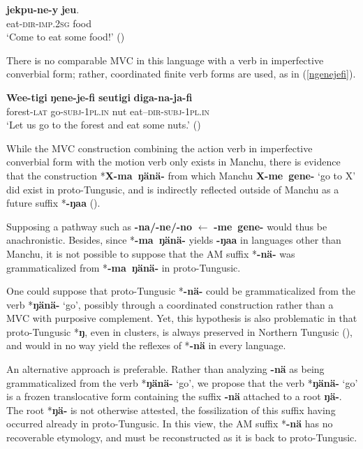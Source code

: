 \documentclass{article}
\newcommand{\ipa}[1]{\textbf{{\phon\mbox{#1}}}} %
\begin{document}
\begin{exe}
\ex 
\gll \ipa{jekpu-ne-y} \ipa{jeu}. \\
eat-\textsc{dir-imp.2sg} food \\
\glt ‘Come to eat some food!’ (\citealt[122]{nikolaeva01udihe})
\end{exe}

There is no comparable MVC in this language with a verb in imperfective converbial form; rather, coordinated finite verb forms are used, as in (\ref{ngenejefi}).

\begin{exe}
\ex \label{ngenejefi}
\gll 
\ipa{Wee-tigi} 	\ipa{ŋene-je-fi} 	\ipa{seutigi} 	\ipa{diga-na-ja-fi} \\
forest-\textsc{lat} go-\textsc{subj-1pl.in} nut eat--\textsc{dir-subj-1pl.in} \\
\glt ‘Let us go to the forest and eat some nuts.’ (\citealt[121]{nikolaeva01udihe})
\end{exe}

While the MVC construction combining the action verb in imperfective converbial form with the motion verb only exists in Manchu, there is evidence that the construction *\ipa{X-ma ŋänä-} from which Manchu \ipa{X-me gene-} `go to X' did exist in proto-Tungusic, and is indirectly reflected outside of Manchu as a future suffix *\ipa{-ŋaa} (\citealt[64++]{fuente11tungusic}).


Supposing a pathway such as \ipa{-na/-ne/-no} $\leftarrow$ \ipa{-me gene-} would thus be anachronistic. Besides, since *\ipa{-ma ŋänä-} yields \ipa{-ŋaa} in languages other than Manchu, it is not possible to suppose that the AM suffix *\ipa{-nä-} was grammaticalized from *\ipa{-ma ŋänä-} in proto-Tungusic.

One could suppose that proto-Tungusic *\ipa{-nä-} could be grammaticalized from the verb *\ipa{ŋänä-} `go', possibly through a coordinated construction rather than a MVC with purposive complement. Yet, this hypothesis is also problematic in that proto-Tungusic *\ipa{ŋ}, even in clusters, is always preserved in Northern Tungusic (\citealt[241-4]{cincius49fonetika}), and would in no way yield the reflexes of *\ipa{-nä} in every language.

An alternative approach is preferable. Rather than analyzing \ipa{-nä} as being grammaticalized from the verb *\ipa{ŋänä-} `go', we propose that the verb *\ipa{ŋänä-} `go' is a frozen translocative form containing the suffix \ipa{-nä} attached to a root \ipa{ŋä-}. The root *\ipa{ŋä-} is not otherwise attested, the fossilization of this suffix having occurred already in proto-Tungusic. In this view, the AM suffix *\ipa{-nä} has no recoverable etymology, and must be reconstructed as it is back to proto-Tungusic.
\end{document}
